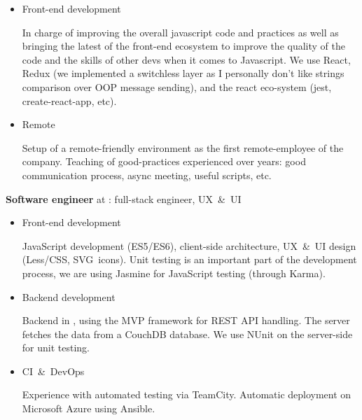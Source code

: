 \begin{rubric}{
}
\begin{itemize}
\item Front-end development

In charge of improving the overall javascript code and practices as well as bringing the latest of the front-end ecosystem
to improve the quality of the code and the skills of other devs when it comes to Javascript. We use React, Redux (we implemented
a switchless layer as I personally don't like strings comparison over OOP message sending), and the react eco-system (jest, create-react-app, etc).

\item Remote

Setup of a remote-friendly environment as the first remote-employee of the company. Teaching of good-practices experienced over years:
good communication process, async meeting, useful scripts, etc.

\end{itemize}

\textbf{Software engineer} at : full-stack engineer, UX~\&~UI

\begin{itemize}
\item Front-end development

  JavaScript development (ES5/ES6), client-side architecture, UX~\&~UI design (Less/CSS,
  SVG~icons).  Unit testing is an important part of the development process, we
  are using Jasmine for JavaScript testing (through Karma).

\item Backend development

Backend in \Csharp, using the MVP framework for REST API handling. The server
fetches the data from a CouchDB database. We use NUnit on the server-side for unit testing.

\item CI~\&~DevOps

Experience with automated testing via TeamCity.
Automatic deployment on Microsoft Azure using Ansible.
\end{itemize}




\end{rubric}
